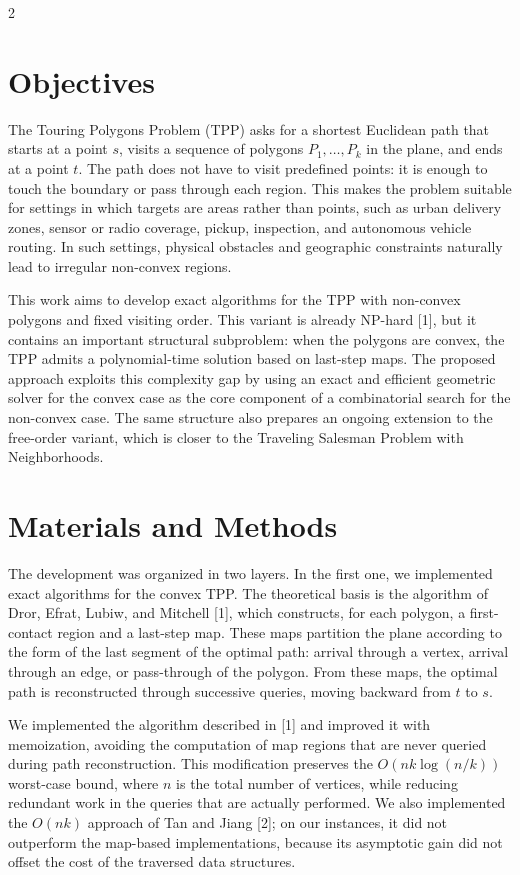 \documentclass[10pt,a4paper]{article}
\begin{document}
\begin{multicols}{2}

\section{Objectives}

The Touring Polygons Problem (TPP) asks for a shortest Euclidean path that starts at a point \(s\), visits a sequence of polygons \(P_1,\ldots,P_k\) in the plane, and ends at a point \(t\). The path does not have to visit predefined points: it is enough to touch the boundary or pass through each region. This makes the problem suitable for settings in which targets are areas rather than points, such as urban delivery zones, sensor or radio coverage, pickup, inspection, and autonomous vehicle routing. In such settings, physical obstacles and geographic constraints naturally lead to irregular non-convex regions.

This work aims to develop exact algorithms for the TPP with non-convex polygons and fixed visiting order. This variant is already NP-hard [1], but it contains an important structural subproblem: when the polygons are convex, the TPP admits a polynomial-time solution based on last-step maps. The proposed approach exploits this complexity gap by using an exact and efficient geometric solver for the convex case as the core component of a combinatorial search for the non-convex case. The same structure also prepares an ongoing extension to the free-order variant, which is closer to the Traveling Salesman Problem with Neighborhoods.

\columnbreak

\section{Materials and Methods}

The development was organized in two layers. In the first one, we implemented exact algorithms for the convex TPP. The theoretical basis is the algorithm of Dror, Efrat, Lubiw, and Mitchell [1], which constructs, for each polygon, a first-contact region and a last-step map. These maps partition the plane according to the form of the last segment of the optimal path: arrival through a vertex, arrival through an edge, or pass-through of the polygon. From these maps, the optimal path is reconstructed through successive queries, moving backward from \(t\) to \(s\).

We implemented the algorithm described in [1] and improved it with memoization, avoiding the computation of map regions that are never queried during path reconstruction. This modification preserves the \(O(nk\log(n/k))\) worst-case bound, where \(n\) is the total number of vertices, while reducing redundant work in the queries that are actually performed. We also implemented the \(O(nk)\) approach of Tan and Jiang [2]; on our instances, it did not outperform the map-based implementations, because its asymptotic gain did not offset the cost of the traversed data structures.

\end{multicols}
\end{document}
